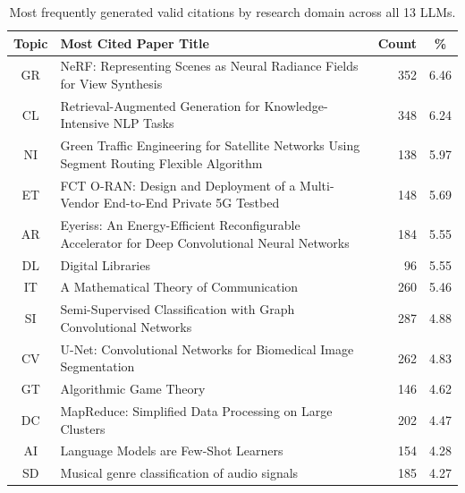 \begin{table}[t]
  \centering
  \begin{threeparttable}
    \caption{Most frequently generated valid citations by research domain across all 13 LLMs.}
    \label{tab:most_cited_by_topic}
    \small
{}
\begin{tabular}{clrc}
\toprule
\textbf{Topic} & \textbf{Most Cited Paper Title} & \textbf{Count} & \textbf{\%} \\
\midrule
GR & NeRF: Representing Scenes as Neural Radiance Fields for View Synthesis & \cellcolor{green!28}352 & \cellcolor{green!28}6.46 \\
CL & Retrieval-Augmented Generation for Knowledge-Intensive NLP Tasks & \cellcolor{green!28}348 & \cellcolor{green!28}6.24 \\
NI & Green Traffic Engineering for Satellite Networks Using Segment Routing Flexible Algorithm & \cellcolor{green!24}138 & \cellcolor{green!24}5.97 \\
ET & FCT O-RAN: Design and Deployment of a Multi-Vendor End-to-End Private 5G Testbed & \cellcolor{green!24}148 & \cellcolor{green!24}5.69 \\
AR & Eyeriss: An Energy-Efficient Reconfigurable Accelerator for Deep Convolutional Neural Networks & \cellcolor{green!24}184 & \cellcolor{green!24}5.55 \\
DL & Digital Libraries & \cellcolor{green!24}96 & \cellcolor{green!24}5.55 \\
IT & A Mathematical Theory of Communication & \cellcolor{green!24}260 & \cellcolor{green!24}5.46 \\
SI & Semi-Supervised Classification with Graph Convolutional Networks & \cellcolor{green!16}287 & \cellcolor{green!16}4.88 \\
CV & U-Net: Convolutional Networks for Biomedical Image Segmentation & \cellcolor{green!16}262 & \cellcolor{green!16}4.83 \\
GT & Algorithmic Game Theory & \cellcolor{green!16}146 & \cellcolor{green!16}4.62 \\
DC & MapReduce: Simplified Data Processing on Large Clusters & \cellcolor{green!16}202 & \cellcolor{green!16}4.47 \\
AI & Language Models are Few-Shot Learners & \cellcolor{green!16}154 & \cellcolor{green!16}4.28 \\
SD & Musical genre classification of audio signals & \cellcolor{green!16}185 & \cellcolor{green!16}4.27 \\

\end{tabular}
\end{threeparttable}
\end{table}
